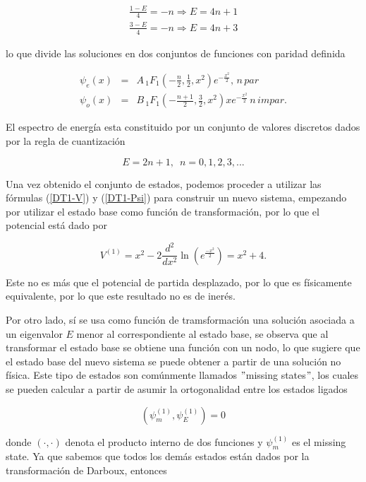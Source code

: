 \begin{eqnarray*}
	\frac{1-E}{4} = -n \Rightarrow E = 4 n + 1
	\\
	\frac{3-E}{4} = -n \Rightarrow E = 4 n + 3
\end{eqnarray*}


lo que divide las soluciones en dos conjuntos de funciones con paridad definida

\begin{eqnarray*}
	\psi_e(x) &=& A \,_1 F_1 \left(-\frac{n}{2}, \frac{1}{2},x^2 \right) e^{-\frac{x^2}{2}}, \, n \, par
	\\
	\psi_o(x) &=&  B \,_1 F_1 \left(-\frac{n+1}{2}, \frac{3}{2}, x^2 \right) x e^{-\frac{x^2}{2}} \, n \, impar .
\end{eqnarray*}

El espectro de energía esta constituido por un conjunto de valores discretos dados por la regla de cuantización

\begin{equation*}
E = 2 n +1, \,\,\, n = 0,1,2,3,...
\end{equation*}

Una vez obtenido el conjunto de estados, podemos proceder a utilizar las fórmulas (\ref{DT1-V}) y (\ref{DT1-Psi}) para construir un nuevo sistema, empezando por utilizar el estado base como función de transformación, por lo que el potencial está dado por

\begin{equation*}
V^{(1)} = x^2 - 2 \frac{d^2}{dx^2} \ln(e^{\frac{-x^2}{2}}) = x^2 + 4.
\end{equation*}

Este no es más que el potencial de partida desplazado, por lo que es físicamente equivalente, por lo que este resultado no es de inerés.

Por otro lado, sí se usa como función de tramsformación una solución asociada a un eigenvalor $E$ menor al correspondiente al estado base, se observa que al transformar el estado base se obtiene una función con un nodo, lo que sugiere que el estado base del nuevo sistema se puede obtener a partir de una solución no física. Este tipo de estados son comúnmente llamados $"$missing states$"$, los cuales se pueden calcular a partir de asumir la ortogonalidad entre los estados ligados

\begin{equation*}
(\psi^{(1)}_m, \psi^{(1)}_E) = 0
\end{equation*}

donde $(\cdot , \cdot)$ denota el producto interno de dos funciones y $\psi^{(1)}_m$ es el missing state. Ya que sabemos que todos los demás estados están dados por la transformación de Darboux, entonces

